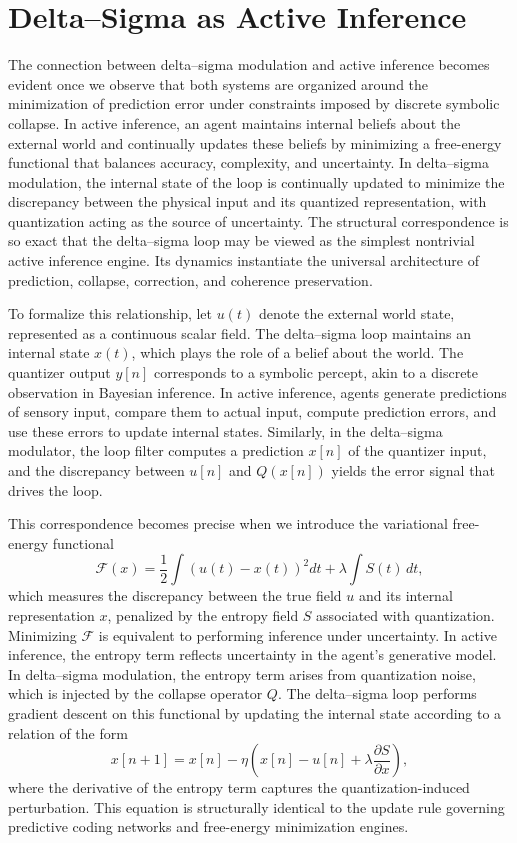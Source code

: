 
\chapter{Delta–Sigma as Active Inference}

The connection between delta–sigma modulation and active inference becomes evident once we observe that both systems are organized around the minimization of prediction error under constraints imposed by discrete symbolic collapse. In active inference, an agent maintains internal beliefs about the external world and continually updates these beliefs by minimizing a free-energy functional that balances accuracy, complexity, and uncertainty. In delta–sigma modulation, the internal state of the loop is continually updated to minimize the discrepancy between the physical input and its quantized representation, with quantization acting as the source of uncertainty. The structural correspondence is so exact that the delta–sigma loop may be viewed as the simplest nontrivial active inference engine. Its dynamics instantiate the universal architecture of prediction, collapse, correction, and coherence preservation.

To formalize this relationship, let \(u(t)\) denote the external world state, represented as a continuous scalar field. The delta–sigma loop maintains an internal state \(x(t)\), which plays the role of a belief about the world. The quantizer output \(y[n]\) corresponds to a symbolic percept, akin to a discrete observation in Bayesian inference. In active inference, agents generate predictions of sensory input, compare them to actual input, compute prediction errors, and use these errors to update internal states. Similarly, in the delta–sigma modulator, the loop filter computes a prediction \(x[n]\) of the quantizer input, and the discrepancy between \(u[n]\) and \(Q(x[n])\) yields the error signal that drives the loop.

This correspondence becomes precise when we introduce the variational free-energy functional
\[
\mathcal{F}(x) = \frac{1}{2} \int \left( u(t) - x(t) \right)^{2} dt + \lambda \int S(t)\, dt,
\]
which measures the discrepancy between the true field \(u\) and its internal representation \(x\), penalized by the entropy field \(S\) associated with quantization. Minimizing \(\mathcal{F}\) is equivalent to performing inference under uncertainty. In active inference, the entropy term reflects uncertainty in the agent’s generative model. In delta–sigma modulation, the entropy term arises from quantization noise, which is injected by the collapse operator \(Q\). The delta–sigma loop performs gradient descent on this functional by updating the internal state according to a relation of the form
\[
x[n+1] = x[n] - \eta\left( x[n] - u[n] + \lambda \frac{\partial S}{\partial x} \right),
\]
where the derivative of the entropy term captures the quantization-induced perturbation. This equation is structurally identical to the update rule governing predictive coding networks and free-energy minimization engines.

